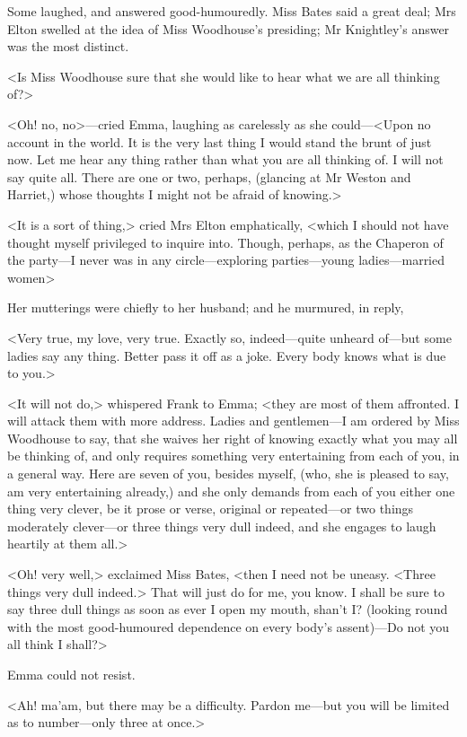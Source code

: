 Some laughed, and answered good-humouredly. Miss Bates said a great deal; Mrs Elton swelled at the idea of Miss Woodhouse's presiding; Mr Knightley's answer was the most distinct.

<Is Miss Woodhouse sure that she would like to hear what we are all thinking of?>

<Oh! no, no>—cried Emma, laughing as carelessly as she could—<Upon no account in the world. It is the very last thing I would stand the brunt of just now. Let me hear any thing rather than what you are all thinking of. I will not say quite all. There are one or two, perhaps, (glancing at Mr Weston and Harriet,) whose thoughts I might not be afraid of knowing.>

<It is a sort of thing,> cried Mrs Elton emphatically, <which I should not have thought myself privileged to inquire into. Though, perhaps, as the Chaperon of the party—I never was in any circle—exploring parties—young ladies—married women\longdash>

Her mutterings were chiefly to her husband; and he murmured, in reply,

<Very true, my love, very true. Exactly so, indeed—quite unheard of—but some ladies say any thing. Better pass it off as a joke. Every body knows what is due to you.>

<It will not do,> whispered Frank to Emma; <they are most of them affronted. I will attack them with more address. Ladies and gentlemen—I am ordered by Miss Woodhouse to say, that she waives her right of knowing exactly what you may all be thinking of, and only requires something very entertaining from each of you, in a general way. Here are seven of you, besides myself, (who, she is pleased to say, am very entertaining already,) and she only demands from each of you either one thing very clever, be it prose or verse, original or repeated—or two things moderately clever—or three things very dull indeed, and she engages to laugh heartily at them all.>

<Oh! very well,> exclaimed Miss Bates, <then I need not be uneasy. <Three things very dull indeed.> That will just do for me, you know. I shall be sure to say three dull things as soon as ever I open my mouth, shan't I\@? (looking round with the most good-humoured dependence on every body's assent)—Do not you all think I shall?>

Emma could not resist.

<Ah! ma'am, but there may be a difficulty. Pardon me—but you will be limited as to number—only three at once.>

